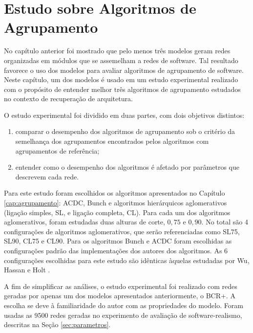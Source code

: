 
\chapter{Estudo sobre Algoritmos de Agrupamento} \label{cap:estudo}

\begin{section}[Introdução]

No capítulo anterior foi mostrado que pelo menos três modelos geram redes organizadas em módulos que se assemelham a redes de software. Tal resultado favorece o uso dos modelos para avaliar algoritmos de agrupamento de software. Neste capítulo, um dos modelos é usado em um estudo experimental realizado com o propósito de entender melhor três algoritmos de agrupamento estudados no contexto de recuperação de arquitetura.

O estudo experimental foi dividido em duas partes, com dois objetivos distintos:
\begin{enumerate}
	\item comparar o desempenho dos algoritmos de agrupamento sob o critério da semelhança dos agrupamentos encontrados pelos algoritmos com agrupamentos de referência;
	\item entender como o desempenho dos algoritmos é afetado por parâmetros que descrevem cada rede.
\end{enumerate}

Para este estudo foram escolhidos os algoritmos apresentados no Capítulo \ref{cap:agrupamento}: ACDC, Bunch e algoritmos hierárquicos aglomerativos (ligação simples, SL, e ligação completa, CL). Para cada um dos algoritmos aglomerativos, foram estudadas duas alturas de corte, $0,75$ e $0,90$. No total são 4 configurações de algoritmos aglomerativos, que serão referenciadas como SL75, SL90, CL75 e CL90. Para os algoritmos Bunch e ACDC foram escolhidas as configurações padrão das implementações dos autores dos algoritmos. As 6 configurações escolhidas para este estudo são idênticas àquelas estudadas por Wu, Hassan e Holt \cite{Wu2005}.

A fim de simplificar as análises, o estudo experimental foi realizado com redes geradas por apenas um dos modelos apresentados anteriormente, o BCR+. A escolha se deve à familiaridade do autor com as propriedades do modelo. Foram usadas as 9500 redes geradas no experimento de avaliação de software-realismo, descritas na Seção \ref{sec:parametros}.
	
\end{section}

